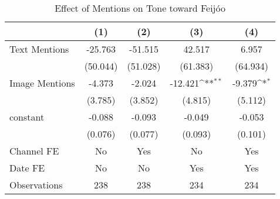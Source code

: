 \begin{table}[htbp]\centering
\def\sym#1{\ifmmode^{#1}\else\(^{#1}\)\fi}
\caption{Effect of Mentions on Tone toward Feijóo}
\begin{tabular}{l*{4}{c}}
\hline\hline
                &\multicolumn{1}{c}{(1)}         &\multicolumn{1}{c}{(2)}         &\multicolumn{1}{c}{(3)}         &\multicolumn{1}{c}{(4)}         \\
\hline
Text Mentions   &  -25.763         &  -51.515         &   42.517         &    6.957         \\
                & (50.044)         & (51.028)         & (61.383)         & (64.934)         \\
Image Mentions  &   -4.373         &   -2.024         &  -12.421\sym{**} &   -9.379\sym{*}  \\
                &  (3.785)         &  (3.852)         &  (4.815)         &  (5.112)         \\
constant          &   -0.088         &   -0.093         &   -0.049         &   -0.053         \\
                &  (0.076)         &  (0.077)         &  (0.093)         &  (0.101)         \\
Channel FE      &       No         &      Yes         &       No         &      Yes         \\
Date FE         &       No         &       No         &      Yes         &      Yes         \\
\hline
Observations    &      238         &      238         &      234         &      234         \\
\hline\hline
\end{tabular}
\end{table}
